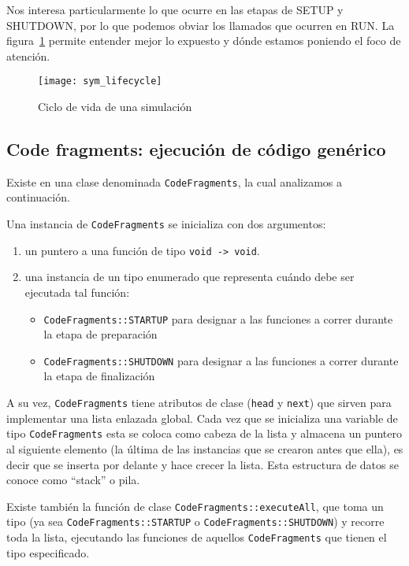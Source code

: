 Nos interesa particularmente lo que ocurre en las etapas de SETUP y SHUTDOWN,
por lo que podemos obviar los llamados que ocurren en RUN. La figura~\ref{fig:symlc}
permite entender mejor lo expuesto y dónde estamos poniendo el foco de
atención.

\begin{figure}[h]
\caption{Ciclo de vida de una simulación}
\label{fig:symlc}
\centering
\texttt{[image: sym\_lifecycle]}
\end{figure}
\subsection{Code fragments: ejecución de código genérico}

Existe en \omnetpp{} una clase denominada \verb!CodeFragments!, la cual
analizamos a continuación.

Una instancia de \verb!CodeFragments! se inicializa con dos argumentos:

\begin{enumerate}
    \item un puntero a una función de tipo \verb!void -> void!.
    \item una instancia de un tipo enumerado que representa cuándo debe ser ejecutada tal función:
    \begin{itemize}
        \item \verb!CodeFragments::STARTUP! para designar a las funciones a correr durante la etapa de preparación
        \item \verb!CodeFragments::SHUTDOWN! para designar a las funciones a correr durante la etapa de finalización
    \end{itemize}
\end{enumerate}

A su vez, \verb!CodeFragments! tiene atributos de clase (\verb!head! y
\verb!next!) que sirven para implementar una lista enlazada global. Cada vez
que se inicializa una variable de tipo \verb!CodeFragments! esta se coloca como
cabeza de la lista y almacena un puntero al siguiente elemento (la última de
las instancias que se crearon antes que ella), es decir que se inserta por
delante y hace crecer la lista.  Esta estructura de datos se conoce como
``stack'' o pila.

Existe también la función de clase \verb!CodeFragments::executeAll!, que toma
un tipo (ya sea \verb!CodeFragments::STARTUP! o \verb!CodeFragments::SHUTDOWN!)
y recorre toda la lista, ejecutando las funciones de aquellos
\verb!CodeFragments! que tienen el tipo especificado.


